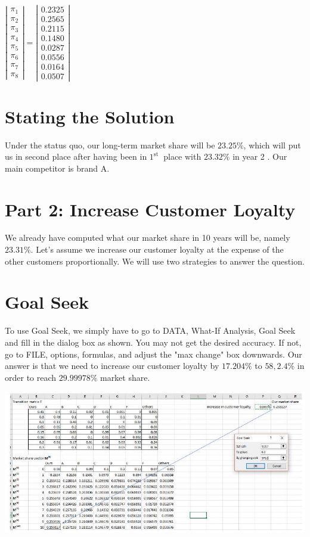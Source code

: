 \documentclass[10pt]{article}
\begin{document}
$\left|\begin{array}{l}\pi_{1} \\ \pi_{2} \\ \pi_{3} \\ \pi_{4} \\ \pi_{5} \\ \pi_{6} \\ \pi_{7} \\ \pi_{8}\end{array}\right|=\left|\begin{array}{l}0.2325 \\ 0.2565 \\ 0.2115 \\ 0.1480 \\ 0.0287 \\ 0.0556 \\ 0.0164 \\ 0.0507\end{array}\right|$

\section{Stating the Solution}
Under the status quo, our long-term market share will be $23.25 \%$, which will put us in second place after having been in $1^{\text {st }}$ place with $23.32 \%$ in year 2 . Our main competitor is brand A.

\section{Part 2: Increase Customer Loyalty}
We already have computed what our market share in 10 years will be, namely $23.31 \%$. Let's assume we increase our customer loyalty at the expense of the other customers proportionally. We will use two strategies to answer the question.

\section{Goal Seek}
To use Goal Seek, we simply have to go to DATA, What-If Analysis, Goal Seek and fill in the dialog box as shown. You may not get the desired accuracy. If not, go to FILE, options, formulas, and adjust the "max change" box downwards. Our answer is that we need to increase our customer loyalty by $17.204 \%$ to $58,2.4 \%$ in order to reach $29.99978 \%$ market share.

\includegraphics[max width=\textwidth]{2022_07_05_5945264bba2a5f6ba667g-77}
\end{document}
